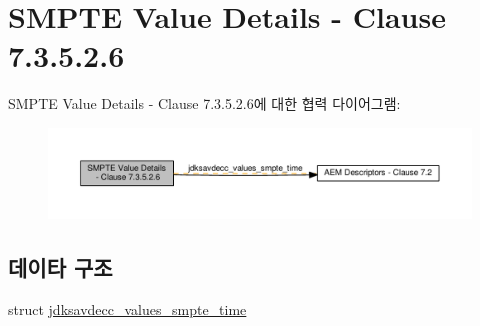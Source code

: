 \hypertarget{group__values__smpte__time}{}\section{S\+M\+P\+TE Value Details -\/ Clause 7.3.5.2.6}
\label{group__values__smpte__time}
S\+M\+P\+TE Value Details -\/ Clause 7.3.5.2.6에 대한 협력 다이어그램\+:
\nopagebreak
\begin{figure}[H]
\begin{center}
\leavevmode
\includegraphics[width=350pt]{group__values__smpte__time}
\end{center}
\end{figure}
\subsection*{데이타 구조}
\begin{DoxyCompactItemize}
\item 
struct \hyperlink{structjdksavdecc__values__smpte__time}{jdksavdecc\+\_\+values\+\_\+smpte\+\_\+time}
\end{DoxyCompactItemize}
